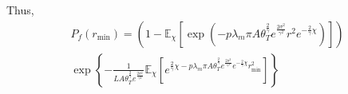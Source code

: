 Thus,
\begin{multline}
P_{f}(r_{\text{min}}) = ( 1- \mathbb{E}_{\chi}\left[ \exp(-p \lambda_{m} \pi A \theta_{T}^{\frac{2}{\gamma}} e^{\frac{2\sigma^2}{\gamma^2}}  r^2 e^{-\frac{2}{\gamma}\chi}) \right])  \\ \exp\left\lbrace -\frac{1}{L A \theta_{T}^{\frac{2}{\gamma}} e^{\frac{2\sigma^2}{\gamma^2}} } \mathbb{E}_{\chi}\left[ e^{\frac{2}{\gamma}\chi -p \lambda_{m} \pi A \theta_{T}^{\frac{2}{\gamma}} e^{\frac{2\sigma^2}{\gamma^2}} e^{-\frac{2}{\gamma}\chi} r_{\text{min}}^2} \right]  \right\rbrace
\end{multline}
